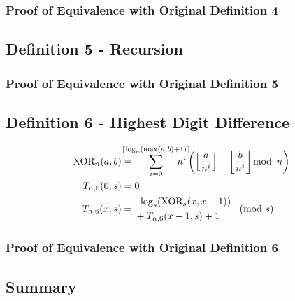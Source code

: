 \documentclass[conference]{IEEEtran}
\begin{document}
\subsubsection{Proof of Equivalence with Original Definition 4}

\subsection{Definition 5 - Recursion}


\subsubsection{Proof of Equivalence with Original Definition 5}

\subsection{Definition 6 - Highest Digit Difference}

\begin{equation}
    \begin{aligned}
\text{XOR}_{n}(a, b) &= \hspace{-13pt} \sum_{i=0}^{\ceil{\log_{n}(\max(a,b) + 1)}} \hspace{-15pt} n^i \left(\floor{\dfrac{a}{n^i}} - \floor{\dfrac{b}{n^i}} \mod{n}\right) \\
       T_{n,6}(0, s) &= 0 \\
       T_{n,6}(x, s) &= \begin{aligned}[c]
           &\floor{\log_s(\text{XOR}_{s}(x, x - 1))} \\
           &+ T_{n,6}(x - 1, s) + 1
       \end{aligned} \pmod{s}
    \end{aligned}
\end{equation}


\subsubsection{Proof of Equivalence with Original Definition 6}

\subsection{Summary}
\end{document}
